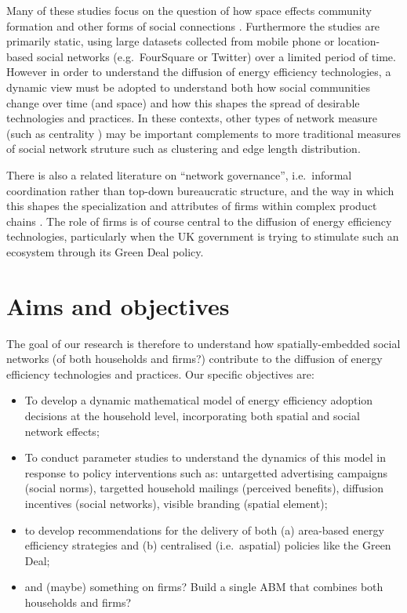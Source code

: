 \documentclass{jk-article}
\begin{document}
Many of these studies focus on the question of how space effects community formation and other forms of social connections \cite{Scellato_Lambiotte_Mascolo_2010, Expert_Evans_Blondel_Lambiotte_2011}.  Furthermore the studies are primarily static, using large datasets collected from mobile phone or location-based social networks (e.g.\ FourSquare or Twitter) over a limited period of time.  However in order to understand the diffusion of energy efficiency technologies, a dynamic view must be adopted to understand both how social communities change over time (and space) and how this shapes the spread of desirable technologies and practices.  In these contexts, other types of network measure (such as centrality \cite{Crucitti_Latora_Porta_2006}) may be important complements to more traditional measures of social network struture such as clustering and edge length distribution.

There is also a related literature on ``network governance'', i.e.\ informal coordination rather than top-down bureaucratic structure, and the way in which this shapes the specialization and attributes of firms within complex product chains \cite{Jones_Hesterly_Borgatti_1997}.  The role of firms is of course central to the diffusion of energy efficiency technologies, particularly when the UK government is trying to stimulate such an ecosystem through its Green Deal policy.

\section{Aims and objectives}
The goal of our research is therefore to understand how spatially-embedded social networks (of both households and firms?) contribute to the diffusion of energy efficiency technologies and practices.  Our specific objectives are:
\begin{itemize}
\item To develop a dynamic mathematical model of energy efficiency adoption decisions at the household level, incorporating both spatial and social network effects;
\item To conduct parameter studies to understand the dynamics of this model in response to policy interventions such as: untargetted advertising campaigns (social norms), targetted household mailings (perceived benefits), diffusion incentives (social networks), visible branding (spatial element);
\item to develop recommendations for the delivery of both (a) area-based energy efficiency strategies and (b) centralised (i.e.\ aspatial) policies like the Green Deal;
\item and (maybe) something on firms?  Build a single ABM that combines both households and firms?
\end{itemize}
\end{document}
